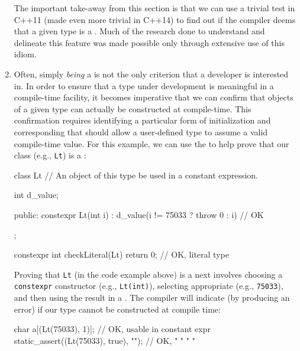 \begin{enumerate}
{The important take-away from this section is that we can use a trivial
test in C++11 (made even more trivial in C++14) to find out if the
compiler deems that a given type is a . Much of the
research done to understand and delineate this feature was made possible
only through extensive use of this  idiom.}

\item{Often, simply \emph{being} a  is not the only criterion that a developer is interested in. In order to ensure that a type under development is meaningful in a compile-time facility, it becomes imperative that we can confirm that objects of a given type can actually be constructed at compile-time. This confirmation requires identifying a particular form of initialization and corresponding  that should allow a user-defined type to assume a valid compile-time value. For this example, we can use the  to help prove that our class (e.g., \lstinline!Lt!) is a :

\begin{emcppslisting}[emcppsbatch=e10] %
class Lt  // An object of this type be used in a constant expression.
{
    int d_value;

public:
    constexpr Lt(int i) : d_value(i != 75033 ? throw 0 : i) { }  // OK
};

constexpr int checkLiteral(Lt) { return 0; }  // OK, literal type
\end{emcppslisting} 
    

\noindent Proving that \lstinline!Lt! (in the code example above) is a
 next involves choosing a
\lstinline!constexpr! constructor (e.g., \lstinline!Lt(int)!), selecting
appropriate  (e.g., \lstinline!75033!), and then
using the result in a . The compiler will
indicate (by producing an error) if our type cannot be constructed at
compile time:

\begin{emcppslisting}[emcppsbatch=e10] %
char a[(Lt(75033), 1)];               // OK, usable in constant expr
static_assert((Lt(75033), true), ""); // OK,   "    "     "       "
\end{emcppslisting}
    

}
\end{enumerate}
